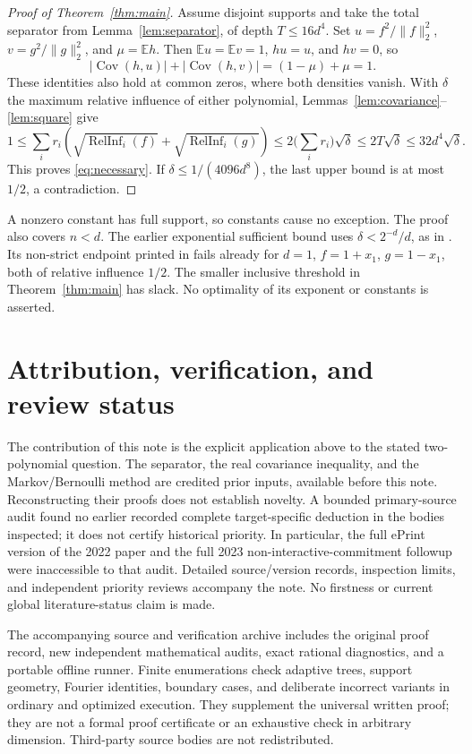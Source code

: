\documentclass[11pt]{article}
\newcommand{\E}{\mathbb E}
\newcommand{\Cov}{\operatorname{Cov}}
\newcommand{\RelInf}{\operatorname{RelInf}}
\begin{document}
\begin{proof}[Proof of Theorem~\ref{thm:main}]
Assume disjoint supports and take the total separator from
Lemma~\ref{lem:separator}, of depth \(T\le16d^4\).
Set \(u=f^2/\|f\|_2^2\), \(v=g^2/\|g\|_2^2\), and
\(\mu=\E h\). Then \(\E u=\E v=1\), \(hu=u\), and \(hv=0\), so
\[
 |\Cov(h,u)|+|\Cov(h,v)|=(1-\mu)+\mu=1.
\]
These identities also hold at common zeros, where both densities vanish.
With \(\delta\) the maximum relative influence of either polynomial,
Lemmas~\ref{lem:covariance}--\ref{lem:square} give
\[
 1\le \sum_i r_i\!
 \left(\sqrt{\RelInf_i(f)}+\sqrt{\RelInf_i(g)}\right)
 \le2\Big(\sum_i r_i\Big)\sqrt\delta
 \le2T\sqrt\delta\le32d^4\sqrt\delta.
\]
This proves \eqref{eq:necessary}.
If \(\delta\le1/(4096d^8)\), the last upper bound is at most \(1/2\),
a contradiction.
\end{proof}

A nonzero constant has full support, so constants cause no exception.
The proof also covers \(n<d\).
The earlier exponential sufficient bound uses
\(\delta<2^{-d}/d\), as in \cite[\S5.2]{ACC}.
Its non-strict endpoint printed in \cite{OWR} fails already for
\(d=1\), \(f=1+x_1\), \(g=1-x_1\), both of relative influence \(1/2\).
The smaller inclusive threshold in Theorem~\ref{thm:main} has slack.
No optimality of its exponent or constants is asserted.

\section{Attribution, verification, and review status}
The contribution of this note is the explicit application above to the
stated two-polynomial question. The separator, the real covariance
inequality, and the Markov/Bernoulli method are credited prior inputs,
available before this note. Reconstructing their proofs does not establish
novelty. A bounded primary-source audit found no earlier recorded complete
target-specific deduction in the bodies inspected; it does not certify
historical priority. In particular, the full ePrint version of the 2022
paper and the full 2023 non-interactive-commitment followup were
inaccessible to that audit. Detailed source/version records, inspection
limits, and independent priority reviews accompany the note.
No firstness or current global literature-status claim is made.

The accompanying source and verification archive includes the original
proof record, new independent mathematical audits, exact rational
diagnostics, and a portable offline runner. Finite enumerations check
adaptive trees, support geometry, Fourier identities, boundary cases,
and deliberate incorrect variants in ordinary and optimized execution.
They supplement the universal written proof; they are not a formal
proof certificate or an exhaustive check in arbitrary dimension.
Third-party source bodies are not redistributed.
\end{document}
